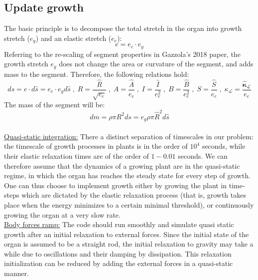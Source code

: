 \documentclass[a4paper, 11pt]{article}
\begin{document}
\subsection*{Update growth}
The basic principle is to decompose the total stretch in the organ into growth stretch ($e_g$) and an elastic stretch ($e_e$):
\begin{equation}
    e=e_e\cdot e_g
\end{equation}
Referring to the re-scaling of segment properties in Gazzola's 2018 paper, the growth stretch $e_g$ does not change the area or curvature of the segment, and adds mass to the segment. Therefore, the following relations hold:
\begin{equation}
    ds=e\cdot d\hat{s}=e_e\cdot e_gd\hat{s}\;,\;
    R=\frac{\hat{R}}{\sqrt{e_e}}\;,\;
    A=\frac{\hat{A}}{e_e}\;,\;
    I=\frac{\hat{I}}{e_e^2}\;,\;
    B=\frac{\hat{B}}{e_e^2}\;,\;
    S=\frac{\hat{S}}{e_e}\;,\;
    \kappa_{\mathcal{L}}=\frac{\hat{\boldsymbol{\kappa}}_{\mathcal{L}}}{e_e}
\end{equation}
The mass of the segment will be:
\begin{equation}
    dm=\rho \pi R^2 ds=e_g\rho\pi\hat{R}^2 d\hat{s}
\end{equation}
\\
\noindent \underline{Quasi-static integration:} There a distinct separation of timescales in our problem: the timescale of growth processes in plants is in the order of $10^4$ seconds, while their elastic relaxation times are of the order of $1-0.01$ seconds. We can therefore assume that the dynamics of a growing plant are in the quasi-static regime, in which the organ has reaches the steady state for every step of growth. One can thus choose to implement growth either by growing the plant in time-steps which are dictated by the elastic relaxation process (that is, growth takes place when the energy minimizes to a certain minimal threshold), or continuously growing the organ at a very slow rate. \\

\noindent \underline{Body forces ramp:} The code should run smoothly and simulate quasi static growth after an initial relaxation to external forces. Since the initial state of the organ is assumed to be a straight rod, the initial relaxation to gravity may take a while due to oscillations and their damping by dissipation. This relaxation initialization can be reduced by adding the external forces in a quasi-static manner.\\
\end{document}
